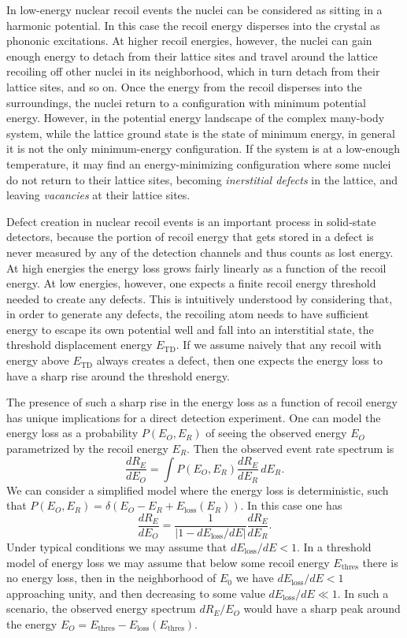 \documentclass[b5paper, 10pt, twoside]{book}
\newcommand{\der}[2]{\frac{d#1}{d#2}}
\newcommand{\difd}{\,d}
\begin{document}
In low-energy nuclear recoil events the nuclei can be considered as sitting in a harmonic potential. In this case the recoil energy disperses into the crystal as phononic excitations. At higher recoil energies, however, the nuclei can gain enough energy to detach from their lattice sites and travel around the lattice recoiling off other nuclei in its neighborhood, which in turn detach from their lattice sites, and so on. Once the energy from the recoil disperses into the surroundings, the nuclei return to a configuration with minimum potential energy. However, in the potential energy landscape of the complex many-body system, while the lattice ground state is the state of minimum energy, in general it is not the only minimum-energy configuration. If the system is at a low-enough temperature, it may find an energy-minimizing configuration where some nuclei do not return to their lattice sites, becoming \emph{inerstitial defects} in the lattice, and leaving \emph{vacancies} at their lattice sites.

Defect creation in nuclear recoil events is an important process in solid-state detectors, because the portion of recoil energy that gets stored in a defect is never measured by any of the detection channels and thus counts as lost energy. At high energies the energy loss grows fairly linearly as a function of the recoil energy. At low energies, however, one expects a finite recoil energy threshold needed to create any defects. This is intuitively understood  by considering that, in order to generate any defects, the recoiling atom needs to have sufficient energy to escape its own potential well and fall into an interstitial state, the threshold displacement energy  $E_\text{TD}$. If we assume naively that any recoil with energy above $E_\text{TD}$ always creates a defect, then one expects the energy loss to have a sharp rise around the threshold energy.

The presence of such a sharp rise in the energy loss as a function of recoil energy has unique implications for a direct detection experiment. One can model the energy loss as a probability $P(E_O,E_R)$ of seeing the observed energy $E_O$ parametrized by the recoil energy $E_R$. Then the observed event rate spectrum is
\begin{equation}
\der{R_E}{E_O}=\int P(E_O,E_R)\der{R_E}{E_R}\difd E_R.
\label{eq:eloss-convolution}
\end{equation}
We can consider a simplified model where the energy loss is deterministic, such that $P(E_O,E_R)=\delta(E_O-E_R+E_\text{loss}(E_R))$. In this case one has
\begin{equation}
\der{R_E}{E_O}=\frac{1}{|1-dE_\text{loss}/dE|}\der{R_E}{E_R}.
\end{equation}
Under typical conditions we may assume that $dE_\text{loss}/dE<1$. In a threshold model of energy loss we may assume that below some recoil energy $E_\text{thres}$ there is no energy loss, then in the neighborhood of $E_0$ we have $dE_\text{loss}/dE<1$ approaching unity, and then decreasing to some value $dE_\text{loss}/dE\ll1$. In such a scenario, the observed energy spectrum $dR_E/E_O$ would have a sharp peak around the energy $E_O=E_\text{thres}-E_\text{loss}(E_\text{thres})$.
\end{document}
